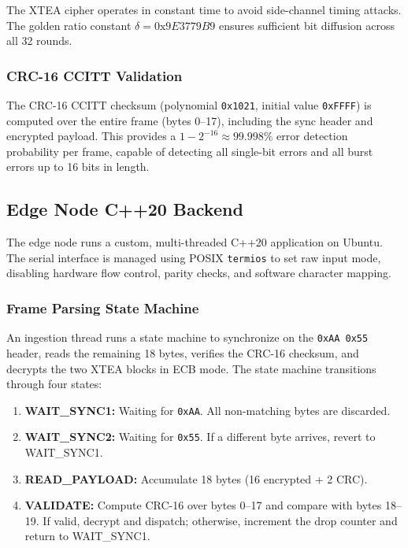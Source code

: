 \documentclass[conference]{IEEEtran}
\begin{document}
The XTEA cipher operates in constant time to avoid side-channel timing attacks. The golden ratio constant $\delta = 0\text{x}9E3779B9$ ensures sufficient bit diffusion across all 32 rounds.

\subsubsection{CRC-16 CCITT Validation}
The CRC-16 CCITT checksum (polynomial \texttt{0x1021}, initial value \texttt{0xFFFF}) is computed over the entire frame (bytes 0--17), including the sync header and encrypted payload. This provides a $1 - 2^{-16} \approx 99.998\%$ error detection probability per frame, capable of detecting all single-bit errors and all burst errors up to 16 bits in length.

\subsection{Edge Node C++20 Backend}
\label{subsec:edge_node}
The edge node runs a custom, multi-threaded C++20 application on Ubuntu. The serial interface is managed using POSIX \texttt{termios} to set raw input mode, disabling hardware flow control, parity checks, and software character mapping.

\subsubsection{Frame Parsing State Machine}
An ingestion thread runs a state machine to synchronize on the \texttt{0xAA 0x55} header, reads the remaining 18 bytes, verifies the CRC-16 checksum, and decrypts the two XTEA blocks in ECB mode. The state machine transitions through four states:

\begin{enumerate}
    \item \textbf{WAIT\_SYNC1:} Waiting for \texttt{0xAA}. All non-matching bytes are discarded.
    \item \textbf{WAIT\_SYNC2:} Waiting for \texttt{0x55}. If a different byte arrives, revert to WAIT\_SYNC1.
    \item \textbf{READ\_PAYLOAD:} Accumulate 18 bytes (16 encrypted + 2 CRC).
    \item \textbf{VALIDATE:} Compute CRC-16 over bytes 0--17 and compare with bytes 18--19. If valid, decrypt and dispatch; otherwise, increment the drop counter and return to WAIT\_SYNC1.
\end{enumerate}
\end{document}
